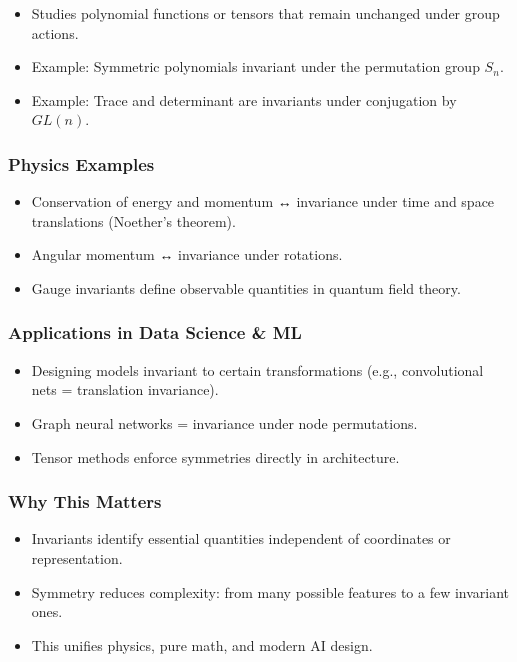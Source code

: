 \documentclass[
  letterpaper,
  DIV=11,
  numbers=noendperiod]{scrreprt}
\providecommand{\tightlist}{%
  \setlength{\itemsep}{0pt}\setlength{\parskip}{0pt}}
\begin{document}
\begin{itemize}
\tightlist
\item
  Studies polynomial functions or tensors that remain unchanged under
  group actions.
\item
  Example: Symmetric polynomials invariant under the permutation group
  \(S_n\).
\item
  Example: Trace and determinant are invariants under conjugation by
  \(GL(n)\).
\end{itemize}

\subsubsection{Physics Examples}\label{physics-examples}

\begin{itemize}
\tightlist
\item
  Conservation of energy and momentum ↔ invariance under time and space
  translations (Noether's theorem).
\item
  Angular momentum ↔ invariance under rotations.
\item
  Gauge invariants define observable quantities in quantum field theory.
\end{itemize}

\subsubsection{Applications in Data Science \&
ML}\label{applications-in-data-science-ml}

\begin{itemize}
\tightlist
\item
  Designing models invariant to certain transformations (e.g.,
  convolutional nets = translation invariance).
\item
  Graph neural networks = invariance under node permutations.
\item
  Tensor methods enforce symmetries directly in architecture.
\end{itemize}

\subsubsection{Why This Matters}\label{why-this-matters-58}

\begin{itemize}
\tightlist
\item
  Invariants identify essential quantities independent of coordinates or
  representation.
\item
  Symmetry reduces complexity: from many possible features to a few
  invariant ones.
\item
  This unifies physics, pure math, and modern AI design.
\end{itemize}
\end{document}
